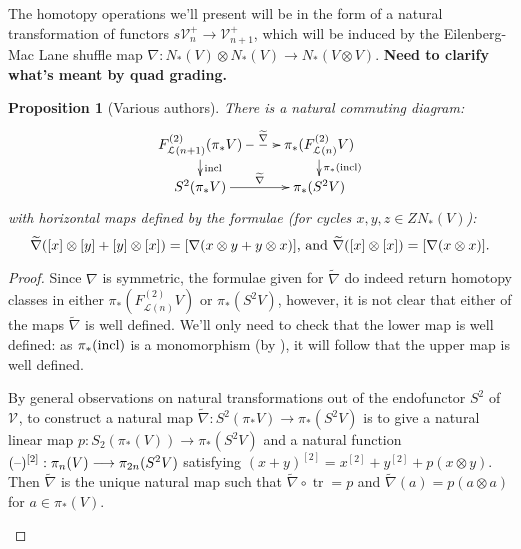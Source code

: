\documentclass[11pt]{amsart}
\theoremstyle{plain}
\newtheorem{prop}[thm]{Proposition}
\theoremstyle{definition}
\DeclareMathOperator{\trace}{tr}
\newcommand{\DASH}{\textup{--}}
\renewcommand{\to}{\longrightarrow}
\newcommand{\calL}{\mathcal{L}}
\newcommand{\calV}{\mathcal{V}}
\theoremstyle{plain}
\newcommand{\restn}[1]{#1^{[2]}}
\newcommand{\vect}[2]{\calV^{#1}_{#2}}
\begin{document}
\begin{Lie algebras in characteristic 2 and their homotopy operations}
The homotopy operations we'll present will be in the form of a natural transformation of functors $s\vect{+}{n}\to \vect{+}{n+1}$, which will be induced by the Eilenberg-Mac Lane shuffle map $\nabla:N_*(V)\otimes N_*(V)\to N_*(V\otimes V)$. \textbf{Need to clarify what's meant by quad grading.}
\begin{prop}[Various authors]\label{the top homotopy operations for Lie algebras}
There is a natural commuting diagram:
\[\xymatrix@R=4mm{
F^{(2)}_{\calL(n+1)}(\pi_*V)\ar@{-->}[r]^-{\widetilde{\nabla}}
\ar[d]^-{\textup{incl}}
&%
\pi_*(F^{(2)}_{\calL(n)}V)\ar[d]^-{\pi_*(\textup{incl})}
\\%
S^2(\pi_*V)\ar[r]^-{\widetilde{\nabla}}&%
\pi_*(S^2V)%
}\]
with horizontal maps defined by the formulae (for cycles $x,y,z\in ZN_*(V)$):
\[\widetilde{\nabla}([x]\otimes[y]+[y]\otimes [x])=[\nabla(x\otimes y+y\otimes x)]\textup{, and }\widetilde{\nabla}([x]\otimes[x])=[\nabla(x\otimes x)].\]
\end{prop}
\begin{proof}
Since $\nabla$ is symmetric, the formulae given for $\widetilde{\nabla}$ do indeed return homotopy classes in either $\pi_*(F^{(2)}_{\calL(n)}V)$ or $\pi_*(S^2V)$, however, it is not clear that either of the maps $\widetilde{\nabla}$ is well defined. We'll only need to check that the lower map is well defined: as $\pi_*(\textup{incl})$ is a monomorphism (by \cite[Prop 5.6]{BousOpnsDerFun.pdf}), it will follow that the upper map is well defined. 
\begin{shaded}\tiny
By general observations on natural transformations out of the endofunctor $S^2$ of $\vect{}{}$, to construct a natural map $\widetilde{\nabla}:S^2(\pi_*V)\to\pi_*(S^2V)$ is to give a natural linear map $p:S_2(\pi_*(V))\to \pi_*(S^2V)$ and a natural function $\restn{(\DASH)}:\pi_n(V)\to \pi_{2n}(S^2V)$ satisfying $\restn{(x+y)}=\restn{x}+\restn{y}+p(x\otimes y)$. Then $\widetilde{\nabla}$ is the unique natural map such that $\widetilde{\nabla}\circ\trace=p$ and $\widetilde{\nabla}(a)=p(a\otimes a)$ for $a\in\pi_*\left(V\right)$.

\end{shaded}
\end{proof}
\end{Lie algebras in characteristic 2 and their homotopy operations}
\end{document}
